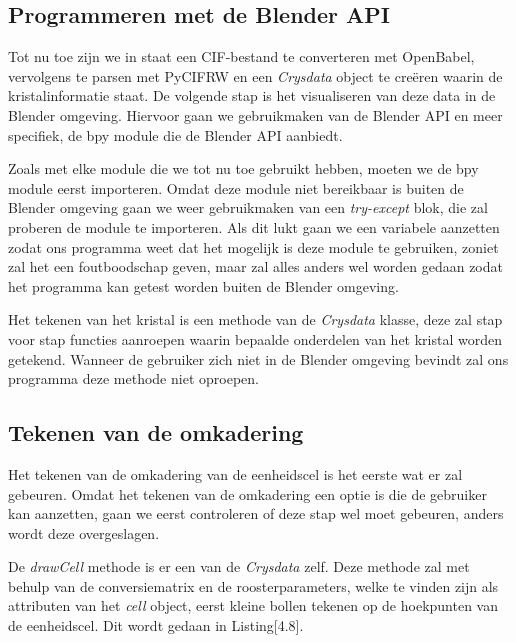 \subsection{Programmeren met de Blender API}
Tot nu toe zijn we in staat een CIF-bestand te converteren met OpenBabel, vervolgens te parsen met PyCIFRW en een \textit{Crysdata} object te creëren waarin de kristalinformatie staat. De volgende stap is het visualiseren van deze data in de Blender omgeving. Hiervoor gaan we gebruikmaken van de Blender API en meer specifiek, de bpy module die de Blender API aanbiedt. 
\par
Zoals met elke module die we tot nu toe gebruikt hebben, moeten we de bpy module eerst importeren. Omdat deze module niet bereikbaar is buiten de Blender omgeving gaan we weer gebruikmaken van een \textit{try-except} blok, die zal proberen de module te importeren. Als dit lukt gaan we een variabele aanzetten zodat ons programma weet dat het mogelijk is deze module te gebruiken, zoniet zal het een foutboodschap geven, maar zal alles anders wel worden gedaan zodat het programma kan getest worden buiten de Blender omgeving.
\par
Het tekenen van het kristal is een methode van de \textit{Crysdata} klasse, deze zal stap voor stap functies aanroepen waarin bepaalde onderdelen van het kristal worden getekend. Wanneer de gebruiker zich niet in de Blender omgeving bevindt zal ons programma deze methode niet oproepen. 

\subsection{Tekenen van de omkadering}

Het tekenen van de omkadering van de eenheidscel is het eerste wat er zal gebeuren. Omdat het tekenen van de omkadering een optie is die de gebruiker kan aanzetten, gaan we eerst controleren of deze stap wel moet gebeuren, anders wordt deze overgeslagen.
\par
De \textit{drawCell} methode is er een van de \textit{Crysdata} zelf. Deze methode zal met behulp van de conversiematrix en de roosterparameters, welke te vinden zijn als attributen van het \textit{cell} object, eerst kleine bollen tekenen op de hoekpunten van de eenheidscel. Dit wordt gedaan in Listing[4.8]. 



